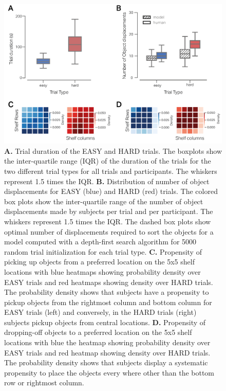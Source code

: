 \begin{figure}[ht]
    \centering
    \includegraphics[width=1\linewidth]{source/figures/results/results_1.png} 
    \caption[Behavioral differences based on the 2 tasks]{\textbf{A.} Trial duration of the EASY and HARD trials. The boxplots show the inter-quartile range (IQR) of the duration of the trials for the two different trial types for all trials and participants. The whiskers represent 1.5 times the IQR. \textbf{B.} Distribution of number of object displacements for EASY (blue) and HARD (red) trials. The colored box plots show the inter-quartile range of the number of object displacements made by subjects per trial and per participant. The whiskers represent 1.5 times the IQR. The dashed box plots show optimal number of displacements required to sort the objects for a model computed with a depth-first search algorithm for 5000 random trial initialization for each trial type. \textbf{C.} Propensity of picking up objects from a preferred location on the 5x5 shelf locations with blue heatmaps showing probability density over EASY trials and red heatmaps showing density over HARD trials. The probability density shows that subjects have a propensity to pickup objects from the rightmost column and bottom column for EASY trials (left) and conversely, in the HARD trials (right) subjects pickup objects from central locations. \textbf{D.} Propensity of dropping-off objects to a preferred location on the 5x5 shelf locations with blue the heatmap showing probability density over EASY trials and red heatmap showing density over HARD trials. The probability density shows that subjects display a systematic propensity to place the objects every where other than the bottom row or rightmost column.
    }\label{figure:easy_hard_diff}
\end{figure}

